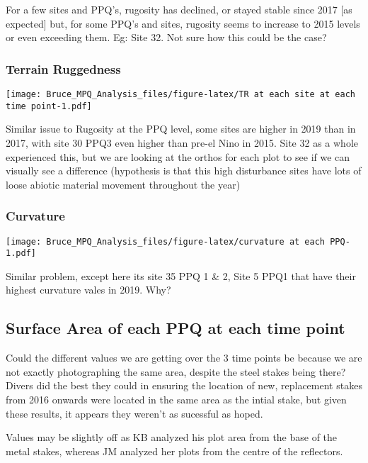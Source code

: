 \documentclass[]{article}
\begin{document}
For a few sites and PPQ's, rugosity has declined, or stayed stable since
2017 {[}as expected{]} but, for some PPQ's and sites, rugosity seems to
increase to 2015 levels or even exceeding them. Eg: Site 32. Not sure
how this could be the case?

\hypertarget{terrain-ruggedness-3}{%
\subsubsection{Terrain Ruggedness}\label{terrain-ruggedness-3}}

\texttt{[image: Bruce\_MPQ\_Analysis\_files/figure-latex/TR at each site at each time point-1.pdf]}

Similar issue to Rugosity at the PPQ level, some sites are higher in
2019 than in 2017, with site 30 PPQ3 even higher than pre-el Nino in
2015. Site 32 as a whole experienced this, but we are looking at the
orthos for each plot to see if we can visually see a difference
(hypothesis is that this high disturbance sites have lots of loose
abiotic material movement throughout the year)

\hypertarget{curvature-3}{%
\subsubsection{Curvature}\label{curvature-3}}

\texttt{[image: Bruce\_MPQ\_Analysis\_files/figure-latex/curvature at each PPQ-1.pdf]}

Similar problem, except here its site 35 PPQ 1 \& 2, Site 5 PPQ1 that
have their highest curvature vales in 2019. Why?

\hypertarget{surface-area-of-each-ppq-at-each-time-point}{%
\subsection{Surface Area of each PPQ at each time
point}\label{surface-area-of-each-ppq-at-each-time-point}}

Could the different values we are getting over the 3 time points be
because we are not exactly photographing the same area, despite the
steel stakes being there? Divers did the best they could in ensuring the
location of new, replacement stakes from 2016 onwards were located in
the same area as the intial stake, but given these results, it appears
they weren't as sucessful as hoped.

Values may be slightly off as KB analyzed his plot area from the base of
the metal stakes, whereas JM analyzed her plots from the centre of the
reflectors.
\end{document}

